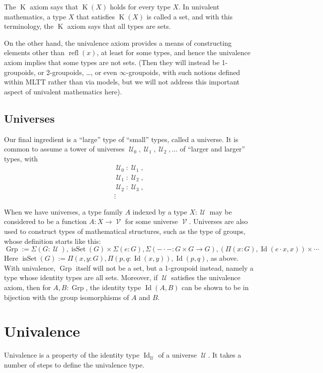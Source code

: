 \documentclass{article}
\newcommand{\Id}{\operatorname{Id}}
\newcommand{\refl}{\operatorname{refl}}
\newcommand{\K}{\operatorname{K}}
\newcommand{\U}{\operatorname{\mathcal{U}}}
\newcommand{\V}{\operatorname{\mathcal{V}}}
\newcommand{\isSet}{\operatorname{isSet}}
\newcommand{\Grp}{\operatorname{Grp}}
\begin{document}
The $\K$ axiom says that $\K(X)$ holds for every type $X$.  In
univalent mathematics, a type $X$ that satisfies $\K(X)$ is called a
set, and with this terminology, the $\K$ axiom says that all types are
sets.

On the other hand, the univalence axiom provides a means of
constructing elements other than $\refl(x)$, at least for some types,
and hence the univalence axiom implies that some types are not
sets. (Then they will instead be 1-groupoids, or 2-groupoids, \dots, or
even $\infty$-groupoids, with such notions defined within MLTT rather
than via models, but we will not address this important aspect of
univalent mathematics here).

\subsection{Universes}

Our final ingredient is a ``large'' type of ``small'' types, called a
universe. It is common to assume a tower of universes $\U_0, \U_1, \U_2, \dots
$ of ``larger and larger'' types, with
\begin{gather*}
   \U_0 : \U_1, \\
   \U_1 : \U_2, \\
   \U_2 : \U_3, \\
\vdots
\end{gather*}

When we have universes, a type family $A$ indexed by a type $X:\U$ may be
considered to be a function $A:X\to \V$ for some universe $\V$.
%
Universes are also used to construct types of mathematical structures,
such as the type of groups, whose definition starts like this:
\[
 \Grp := \Sigma(G:\U), \isSet(G) \times  \Sigma(e:G), \Sigma(-\cdot- : G\times G\to G), (\Pi(x:G), \Id(e \cdot x,x)) \times  \cdots
\]
Here $\isSet(G):=\Pi(x,y:G),\Pi(p,q:\Id(x,y)),\Id(p,q)$, as above. With
univalence, $\Grp$ itself will not be a set, but a 1-groupoid instead,
namely a type whose identity types are all sets. Moreover, if $\U$
satisfies the univalence axiom, then for $A,B:\Grp$, the identity type
$\Id(A,B)$ can be shown to be in bijection with the group isomorphisms of
$A$ and $B$.

\section{Univalence}

Univalence is a property of the identity type $\Id_{\U}$ of a universe $\U$. It
takes a number of steps to define the univalence type.
\end{document}
